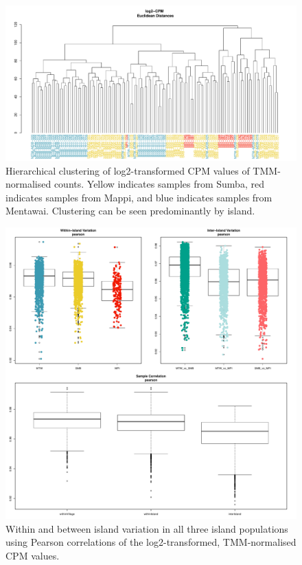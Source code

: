 \documentclass[12pt,a4paper,titlepage,twoside,openright]{book}
\begin{document}
\begin{mainmatter}
\begin{figure}[htb!]
\centering
\includegraphics[width=\textwidth,height=\textheight,keepaspectratio]{SampleDistances_Euclidean.pdf}
\caption{Hierarchical clustering of log2-transformed CPM values of TMM- normalised counts. Yellow indicates samples from Sumba, red indicates samples from Mappi, and blue indicates samples from Mentawai. Clustering can be seen predominantly by island.}
\label{fig:Euclidean Sample Distances}
\end{figure}

\begin{figure}[htb!]
\centering
\includegraphics[width=\textwidth,height=\textheight,keepaspectratio]{IslandVariation_pearson.pdf}
\caption{Within and between island variation in all three island populations using Pearson correlations of the log2-transformed, TMM-normalised CPM values.}
\label{fig:Island Variation}
\end{figure}


\end{mainmatter}
\end{document}
